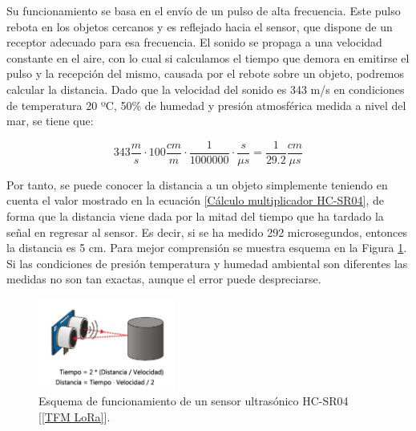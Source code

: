 \documentclass[12pt]{article}
\begin{document}
	\pagebreak
	
	\noindent Su funcionamiento se basa en el envío de un pulso de alta frecuencia. Este pulso rebota en los objetos cercanos y es reflejado hacia el sensor, que dispone de un receptor adecuado para esa frecuencia. El sonido se propaga a una velocidad constante en el aire, con lo cual si calculamos el tiempo que demora en emitirse el pulso y la recepción del mismo, causada por el rebote sobre un objeto, podremos calcular la distancia. Dado que la velocidad del sonido es 343 m/s en condiciones de temperatura 20 ºC, 50\% de humedad y presión atmosférica medida a nivel del mar, se tiene que:
	
	\begin{equation} \label{Cálculo multiplicador HC-SR04}
		343 \frac{m}{s} \cdot 100 \frac{cm}{m} \cdot \frac{1}{1000000} \cdot \frac{s}{\mu s} = \frac{1}{29.2} \frac{cm}{\mu s}
	\end{equation}
	
	\noindent Por tanto, se puede conocer la distancia a un objeto simplemente teniendo en cuenta el valor mostrado en la ecuación \ref{Cálculo multiplicador HC-SR04}, de forma que la distancia viene dada por la mitad del tiempo que ha tardado la señal en regresar al sensor. Es decir, si se ha medido 292 microsegundos, entonces la distancia es 5 cm. Para mejor comprensión se muestra esquema en la Figura \ref{esquema funcionamiento hc-sr04}. Si las condiciones de presión temperatura y humedad ambiental son diferentes las medidas no son tan exactas, aunque el error puede despreciarse. \\
	
	
	\begin{figure}[h]
		\begin{center}
			\includegraphics[width=0.4\textwidth]{img/esquema_funcionamiento_hcsr04.png}
			\caption{Esquema de funcionamiento de un sensor ultrasónico HC-SR04 [\ref{TFM LoRa}].}
			\label{esquema funcionamiento hc-sr04}
		\end{center}
	\end{figure}
\end{document}
